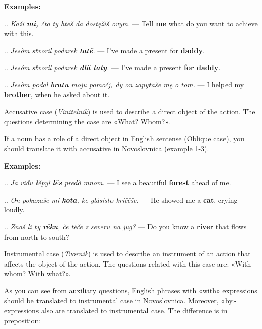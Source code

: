 \textbf{Examples:}

.. \textit{Kaži \textbf{mi}, čto ty hteš da dostęžiš ovym.} — Tell \textbf{me} what do you want to achieve with this.

.. \textit{Jesòm stvoril podarek \textbf{tatě}.} — I've made a present for \textbf{daddy}.

.. \textit{Jesóm stvoril podarek \textbf{dlä taty}.} — I've made a present \textbf{for daddy}.

.. \textit{Jesòm podal \textbf{bratu} moju pomočj, dy on zapytaše mę o tom.} — I helped my \textbf{brother}, when he asked about it.

Accusative case (\textit{Vinitelnik}) is used to describe a direct object of the action. The questions determining the case are «What? Whom?».

If a noun has a role of a direct object in English sentense (Oblique case), you should translate it with accusative in Novoslovnica (example 1-3).

\textbf{Examples:}

.. \textit{Ja viđu lěpyǐ \textbf{lěs} predò mnom.} — I see a beautiful \textbf{forest} ahead of me.

.. \textit{On pokazaše mi \textbf{kota}, ke glåsisto kričěše.} — He showed me a \textbf{cat}, crying loudly.

.. \textit{Znaš li ty \textbf{rěku}, če tëče z severu na jug?} — Do you know a \textbf{river} that flows from north to south?

Instrumental case (\textit{Tvornik}) is used to describe an instrument of an action that affects the object of the action. The questions related with this case are: «With whom? With what?».

As you can see from auxiliary questions, English phrases with «with» expressions should be translated to instrumental case in Novoslovnica. Moreover, «by» expressions also are translated to instrumental case. The difference is in preposition:

